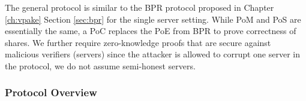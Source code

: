 The general protocol is similar to the \ac{BPR} protocol proposed in Chapter \ref{ch:vpake} Section \ref{sec:bpr} for the single server setting.
While \acl{PoM} and \ac{PoS} are essentially the same, a \ac{PoC} replaces the \ac{PoE} from \ac{BPR} to prove correctness of shares.
We further require zero-knowledge proofs that are secure against malicious verifiers (servers) since the attacker is allowed to corrupt one server in the protocol, \ie we do not assume semi-honest servers.

\subsubsection{Protocol Overview}
%
%
%
%
%
%
%
%

